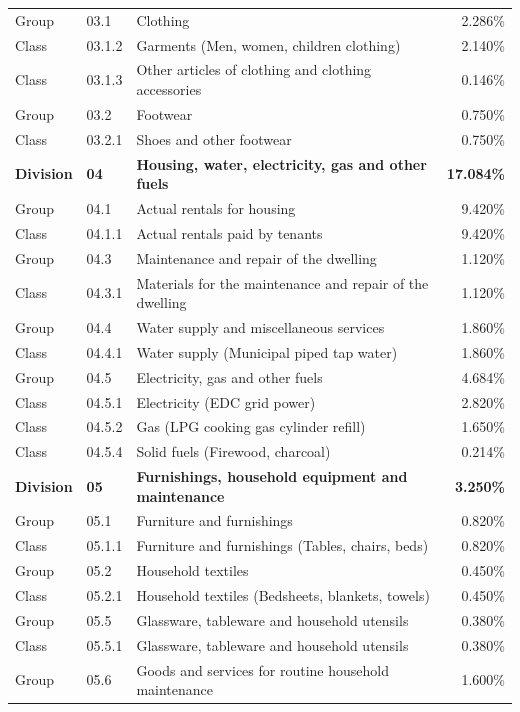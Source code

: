 \documentclass[11pt,a4paper,oneside]{article}
\begin{document}
\begin{longtable}{llp{7.5cm}r}
Group & 03.1 & Clothing & 2.286\% \\
Class & 03.1.2 & Garments (Men, women, children clothing) & 2.140\% \\
Class & 03.1.3 & Other articles of clothing and clothing accessories & 0.146\% \\
Group & 03.2 & Footwear & 0.750\% \\
Class & 03.2.1 & Shoes and other footwear & 0.750\% \\
\midrule
\textbf{Division} & \textbf{04} & \textbf{Housing, water, electricity, gas and other fuels} & \textbf{17.084\%} \\
Group & 04.1 & Actual rentals for housing & 9.420\% \\
Class & 04.1.1 & Actual rentals paid by tenants & 9.420\% \\
Group & 04.3 & Maintenance and repair of the dwelling & 1.120\% \\
Class & 04.3.1 & Materials for the maintenance and repair of the dwelling & 1.120\% \\
Group & 04.4 & Water supply and miscellaneous services & 1.860\% \\
Class & 04.4.1 & Water supply (Municipal piped tap water) & 1.860\% \\
Group & 04.5 & Electricity, gas and other fuels & 4.684\% \\
Class & 04.5.1 & Electricity (EDC grid power) & 2.820\% \\
Class & 04.5.2 & Gas (LPG cooking gas cylinder refill) & 1.650\% \\
Class & 04.5.4 & Solid fuels (Firewood, charcoal) & 0.214\% \\
\midrule
\textbf{Division} & \textbf{05} & \textbf{Furnishings, household equipment and maintenance} & \textbf{3.250\%} \\
Group & 05.1 & Furniture and furnishings & 0.820\% \\
Class & 05.1.1 & Furniture and furnishings (Tables, chairs, beds) & 0.820\% \\
Group & 05.2 & Household textiles & 0.450\% \\
Class & 05.2.1 & Household textiles (Bedsheets, blankets, towels) & 0.450\% \\
Group & 05.5 & Glassware, tableware and household utensils & 0.380\% \\
Class & 05.5.1 & Glassware, tableware and household utensils & 0.380\% \\
Group & 05.6 & Goods and services for routine household maintenance & 1.600\% \\

\end{longtable}
\end{document}
